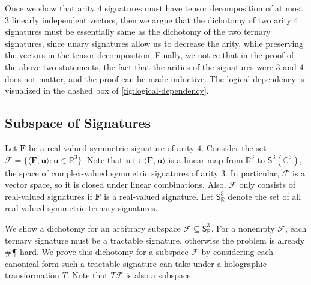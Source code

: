 \documentclass[11pt]{article}
\begin{document}
Once we show that arity $4$ signatures must have tensor decomposition of  at most $3$ linearly independent vectors, 
then we argue that the dichotomy of two arity $4$ signatures must be essentially same as the dichotomy of the two ternary signatures, since unary signatures allow us to decrease the arity, while preserving the vectors in the tensor decomposition.
Finally, we notice that in the proof of the above two statements, the fact that the arities of the signatures were $3$ and $4$ does not matter, and the proof can be made inductive. 
The logical dependency is visualized in the dashed box of \cref{fig:logical-dependency}.

\subsection{Subspace of Signatures}\label{subsec:subspace-signatures}
Let $\mathbf{F}$ be a real-valued symmetric signature of arity $4$.
Consider the set $\mathscr{F} = \{\langle \mathbf{F}, \mathbf{u} \rangle : \mathbf{u} \in \mathbb{R}^3\}$. 
Note that $\mathbf{u} \mapsto \langle \mathbf{F}, \mathbf{u} \rangle$ is a linear map from $\mathbb{R}^3$ to $\mathsf{S}^3(\mathbb{C}^3)$, the space of complex-valued symmetric signatures of arity $3$.
In particular, $\mathscr{F}$ is a vector space, so it is closed under linear combinations.
Also,  $\mathscr{F}$ only consists of real-valued signatures if $\mathbf{F}$ is a real-valued signature.
\newcommand{\symtersig}{\mathsf{S}^3_{\mathbb{R}}}
Let $\symtersig$ denote the set of all real-valued symmetric ternary signatures.

We show a dichotomy for an arbitrary subspace $\mathscr{F} \subseteq \symtersig$.
For a nonempty $\mathscr{F}$, each ternary signature must be a tractable signature, otherwise
the problem is already \#\P-hard.
We prove this dichotomy for a subspace $\mathscr{F}$
by considering each canonical form such a tractable signature can take
under a holographic transformation $T$. Note that $T \mathscr{F}$ is also a subspace.
\end{document}
